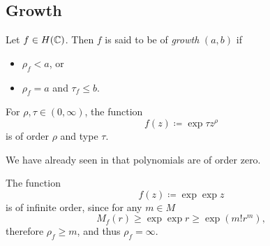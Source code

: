 \subsection{Growth}

\begin{definition}
    Let $f \in H(\mathbb{C})$. Then $f$ is said to be of \emph{growth} $(a, b)$ if
    \begin{itemize}
        \item $\rho_f < a$, or
        \item $\rho_f = a$ and $\tau_f \leq b$.
    \end{itemize}
\end{definition}

\begin{example} \label{exm:order-and-type}
    For $\rho, \tau \in (0, \infty)$, the function
    $$ f(z) \coloneqq \exp {\tau z^\rho} $$
    is of order $\rho$ and type $\tau$.

    We have already seen in  that polynomials are of order zero.

    The function
    $$ f(z) \coloneqq \exp \exp z $$
    is of infinite order, since for any $m \in M$
    $$ M_f(r) \geq \exp \exp r \geq \exp (m! r^m), $$
    therefore $\rho_f \geq m$, and thus $\rho_f = \infty$.
\end{example}

